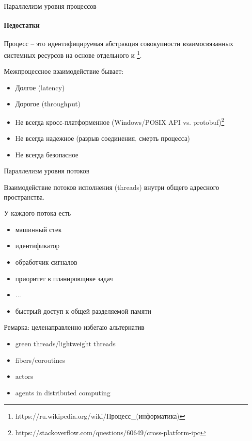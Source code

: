 \begin{frame}{Параллелизм уровня процессов}
\framesubtitle{Недостатки}
Процесс -- это идентифицируемая абстракция совокупности взаимосвязанных системных ресурсов на основе отдельного и {}\footnote{https://ru.wikipedia.org/wiki/Процесс\_(информатика)}.

\pause

Межпроцессное взаимодействие бывает: %
\begin{itemize}
  \item Долгое (latency)
  \item Дорогое (throughput)
  \item Не всегда кросс-платформенное (Windows/POSIX API vs. protobuf)\footnote<2->{https://stackoverflow.com/questions/60649/cross-platform-ipc}
  \item Не всегда надежное (разрыв соединения, смерть процесса)
  \item Не всегда безопасное
\end{itemize}

\pause

\end{frame}


\begin{frame}{Параллелизм уровня потоков}

Взаимодействие потоков исполнения (threads) внутри общего адресного пространства.

\pause
У каждого потока есть

\begin{itemize}
    \item машинный стек
    \item идентификатор
    \item обработчик сигналов
    \item приоритет в планировщике задач
    \item ...
    \pause
    \item быстрый доступ к общей разделяемой памяти
\end{itemize}

\pause
Ремарка: целенаправленно избегаю альтернатив 
\begin{itemize}
 \item green threads/lightweight threads
 \item fibers/coroutines
 \item actors
 \item agents in distributed computing
\end{itemize}

\end{frame}


